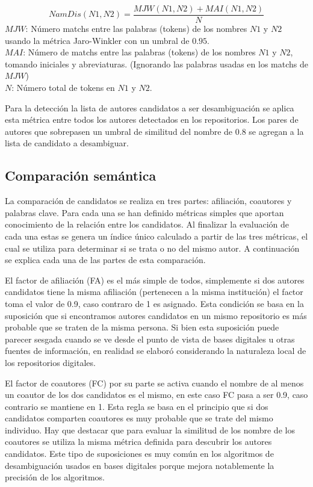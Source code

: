\documentclass[conference]{IEEEtran}
\begin{document}
\begin{equation}\label{eq:metrica}
NamDis(N1, N2) = \frac{MJW(N1, N2)+ MAI(N1,N2)}{N}
\end{equation}
$MJW$: Número matchs entre las palabras (tokens) de los nombres $N1$ y $N2$ usando la métrica Jaro-Winkler con un umbral de $0.95$.\\
$MAI$: Número de matchs entre las palabras (tokens) de los nombres $N1$ y $N2$, tomando iniciales y abreviaturas. (Ignorando las palabras usadas en los matchs de $MJW$)\\
$N$: Número total de tokens en $N1$ y $N2$.

Para la detección la lista de autores candidatos a ser desambiguación se aplica esta métrica entre todos los autores detectados en los repositorios. Los pares de autores que sobrepasen un umbral de similitud del nombre de $0.8$  se agregan a la lista de candidato a desambiguar.

\subsection{Comparación semántica}
La comparación de candidatos se realiza en tres partes:  afiliación, coautores y palabras clave. Para cada una se han definido métricas simples  que aportan conocimiento de la relación entre los candidatos. Al finalizar la evaluación de cada una estas se genera un índice único calculado a partir de las tres métricas, el cual se utiliza para determinar si se trata o no del mismo autor.   A continuación se explica cada una de las partes de esta comparación.

El factor de afiliación (FA) es el más simple de todos, simplemente si dos autores candidatos tiene la misma afiliación (pertenecen a la misma institución) el factor toma el valor de 0.9, caso contraro de 1 es asignado. Esta condición se basa en la suposición que si encontramos autores candidatos en un mismo repositorio es más probable que se traten de la misma persona. Si bien esta suposición puede parecer sesgada cuando se ve desde el punto de vista de bases digitales u otras fuentes de información, en realidad se elaboró considerando la naturaleza local de los repositorios digitales.
 
El factor de coautores (FC) por su parte se activa cuando el nombre de al menos un coautor de los dos candidatos es el mismo, en este caso FC pasa a ser 0.9, caso contrario se mantiene en 1. Esta regla se basa en el principio que si dos candidatos comparten coautores es muy probable que se trate del mismo individuo. Hay que destacar que para evaluar la similitud de los nombre de los coautores se utiliza la misma métrica definida para descubrir los autores candidatos. Este tipo de suposiciones es muy común en los algoritmos de desambiguación usados en bases digitales porque mejora notablemente la precisión de los algoritmos.
\end{document}
